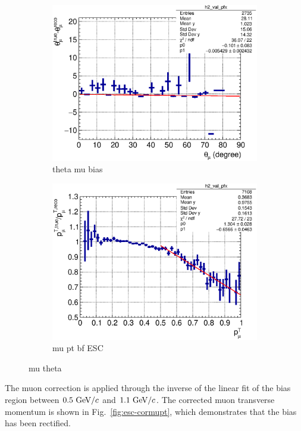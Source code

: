       \begin{figure}
        \centering
        \begin{subfigure}[b]{\dbfigwid\textwidth}
             \centering
             \includegraphics[width=\textwidth]{figures/sel/theta_mu_vs_theta_mu_res_hist2d_al14.eps}
             \caption{theta mu bias}
             \label{subfig:esc-mutheta}
        \end{subfigure}
        \begin{subfigure}[b]{\dbfigwid\textwidth}
             \centering
             \includegraphics[width=\textwidth]{figures/sel/mu_pt_vs_mu_pt_bias_hist2d_al13.eps}
             \caption{mu pt bf ESC}
             \label{subfig:esc-mupt-bfesc}
        \end{subfigure}
        \caption{mu theta }
        \label{fig:esc-muptcor}
  \end{figure}
     The muon correction is applied through the inverse of the linear fit of the bias region between $0.5~\textrm{GeV}/c$ and $1.1~\textrm{GeV}/c$.
     The corrected muon transverse momentum is shown in Fig.~\ref{fig:esc-cormupt}, which demonstrates that the bias has been rectified.
  
